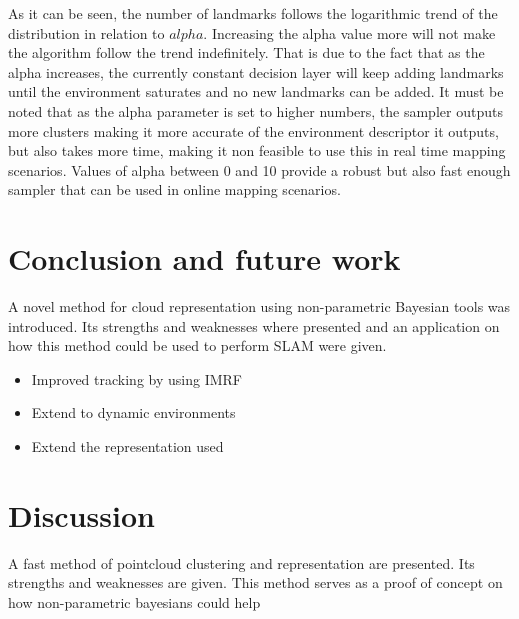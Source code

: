 \documentclass[twoside,hidelinks]{article}
\begin{document}
As it can be seen, the number of landmarks follows the logarithmic trend of the distribution in relation to $alpha$. Increasing the  alpha value more will not make the algorithm follow the trend indefinitely. That is due to the fact that as the alpha increases, the currently constant decision layer will keep adding landmarks until the environment saturates and no new landmarks can be added. It must be noted that as the alpha parameter is set to higher numbers, the sampler outputs more clusters making it more accurate of the environment descriptor it outputs, but also takes more time, making it non feasible to use this in real time mapping scenarios. Values of alpha between 0 and 10 provide a robust but also fast enough sampler that can be used in online mapping scenarios.



\section{Conclusion and future work}
\label{sec:discussion}

A novel method for cloud representation using non-parametric Bayesian tools was introduced. Its strengths and weaknesses where presented and an application on how this method could be used to perform SLAM were given. 

\begin{itemize}
    \item Improved tracking by using IMRF
    \item Extend to dynamic environments
    \item Extend the representation used
\end{itemize}

\section{Discussion}

A fast method of pointcloud clustering and representation are presented. Its strengths and weaknesses are given. This method serves as a proof of concept on how non-parametric bayesians could help 
\end{document}
